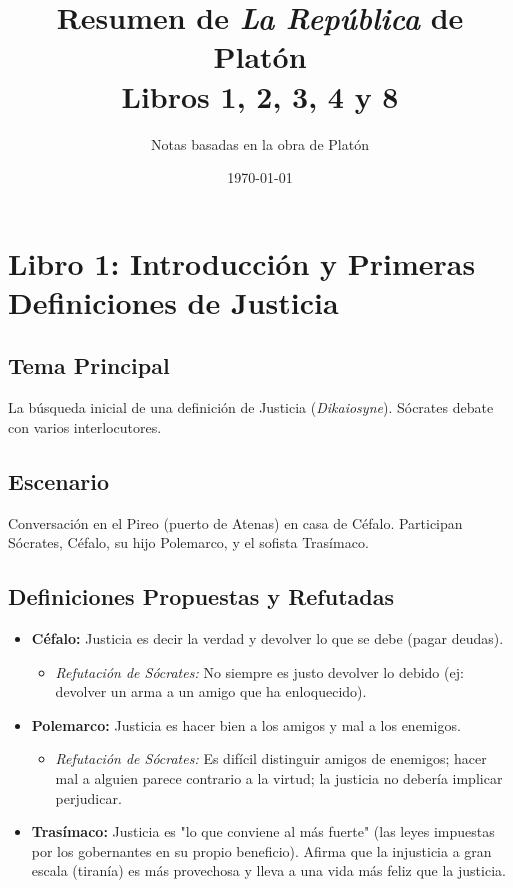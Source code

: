 \documentclass[11pt, a4paper]{article}
\title{Resumen de \textit{La República} de Platón \\ Libros 1, 2, 3, 4 y 8}
\author{Notas basadas en la obra de Platón}
\date{\today}
\begin{document}
\maketitle

\section*{Libro 1: Introducción y Primeras Definiciones de Justicia}

\subsection*{Tema Principal}
La búsqueda inicial de una definición de Justicia (\textit{Dikaiosyne}). Sócrates debate con varios interlocutores.

\subsection*{Escenario}
Conversación en el Pireo (puerto de Atenas) en casa de Céfalo. Participan Sócrates, Céfalo, su hijo Polemarco, y el sofista Trasímaco.

\subsection*{Definiciones Propuestas y Refutadas}
\begin{itemize}
    \item \textbf{Céfalo:} Justicia es decir la verdad y devolver lo que se debe (pagar deudas).
        \begin{itemize}
            \item \textit{Refutación de Sócrates:} No siempre es justo devolver lo debido (ej: devolver un arma a un amigo que ha enloquecido).
        \end{itemize}
    \item \textbf{Polemarco:} Justicia es hacer bien a los amigos y mal a los enemigos.
        \begin{itemize}
            \item \textit{Refutación de Sócrates:} Es difícil distinguir amigos de enemigos; hacer mal a alguien parece contrario a la virtud; la justicia no debería implicar perjudicar.
        \end{itemize}
    \item \textbf{Trasímaco:} Justicia es "lo que conviene al más fuerte" (las leyes impuestas por los gobernantes en su propio beneficio). Afirma que la injusticia a gran escala (tiranía) es más provechosa y lleva a una vida más feliz que la justicia.
\end{itemize}
\end{document}
